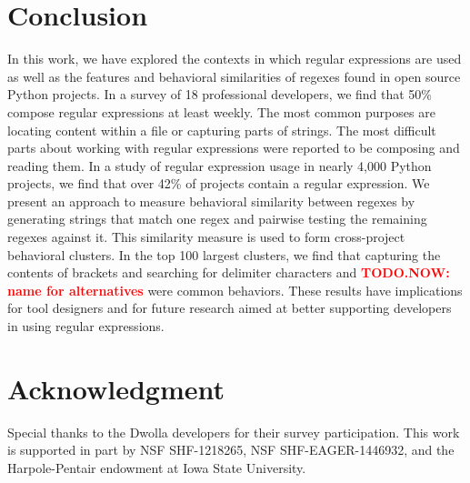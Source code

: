 \documentclass{sig-alternate}
\newcommand{\todoNow}[1]{\textbf{\textcolor{red}{TODO.NOW: #1}}} %
\begin{document}
\section{Conclusion}
\label{sec:conclusion}
In this work, we have explored the contexts in which regular expressions are used as well as the features and behavioral similarities of regexes found in open source Python projects. In a survey of 18 professional developers, we find that 50\% compose regular expressions at least weekly. The most common purposes are locating content within a file or capturing parts of strings. The most difficult parts about working with regular expressions were reported to be composing and reading them.
In a study of regular expression usage in nearly 4,000 Python projects, we find that over 42\% of projects contain a regular expression.
We present an approach to measure behavioral similarity between regexes by generating strings that match one regex and pairwise  testing the remaining regexes against it. This similarity measure is used to form cross-project behavioral clusters. In the top 100 largest clusters, we find that capturing the contents of brackets and searching for delimiter characters and \todoNow{name for alternatives} were common behaviors.
These results have implications for tool designers and for future research aimed at better supporting developers in using regular expressions.


\section*{Acknowledgment}
Special thanks to the Dwolla developers for their survey participation.
This work is supported in part by NSF SHF-1218265, NSF SHF-EAGER-1446932, and the Harpole-Pentair endowment at Iowa State University.




\balance




\end{document}
